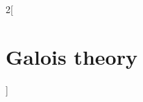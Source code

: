 \documentclass[../../../main.tex]{subfiles}
\begin{document}
\begin{multicols}{2}[\section{Galois theory}]

\end{multicols}
\end{document}

